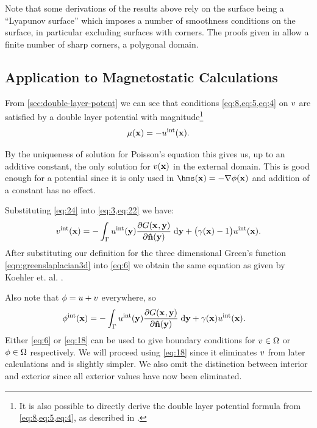 Note that some derivations of the results above rely on the surface being a ``Lyapunov surface'' which imposes a number of smoothness conditions on the surface, in particular excluding surfaces with corners.
The proofs given in \cite{Sternberg1946} allow a finite number of sharp corners, \ie a polygonal domain.

\subsection{Application to Magnetostatic Calculations}
\label{sec:appl-magn-calc}

From \cref{sec:double-layer-potent} we can see that conditions \cref{eq:8,eq:5,eq:4} on $v$ are satisfied by a double layer potential with magnitude\footnote{It is also possible to directly derive the double layer potential formula from \cref{eq:8,eq:5,eq:4}, as described in \cite[Appendix 2]{Knittel2011}.}
\begin{equation}
  \label{eq:24}
  \mu(\boldsymbol{\mathrm{x}}) = - u^{\mathrm{int}}(\boldsymbol{\mathrm{x}}).
\end{equation}

By the uniqueness of solution for Poisson's equation this gives us, up to an additive constant, the only solution for $v(\boldsymbol{\mathrm{x}})$ in the external domain.
This is good enough for a potential since it is only used in $\hms(\xv) = - \grad \phim(\xv)$ and addition of a constant has no effect.

Substituting \cref{eq:24} into \cref{eq:3,eq:22} we have:
\begin{equation}
  \label{eq:6}
  v^{\mathrm{int}}(\boldsymbol{\mathrm{x}}) =
  - \int_{{\Gamma}} u^{\mathrm{int}}(\boldsymbol{\mathrm{y}}) \frac{\partial G(\boldsymbol{\mathrm{x}}_{},\boldsymbol{\mathrm{y}})}{\partial \boldsymbol{\mathrm{\hat{n}}}(\boldsymbol{\mathrm{y}})} {\; \mathrm{{d}}} \boldsymbol{\mathrm{y}}
  + \big(\gamma(\boldsymbol{\mathrm{x}}) - 1 \big) u^{\mathrm{int}}(\boldsymbol{\mathrm{x}}).
\end{equation}
After substituting our definition for the three dimensional Green's function \cref{eqn:greenslaplacian3d} into \cref{eq:6} we obtain the same equation as given by Koehler et. al. \cite{Koehler1997}.

Also note that $\phi = u + v$ everywhere, so
\begin{equation}
  \begin{aligned}
    \label{eq:18}
    \phi^{\mathrm{int}}(\boldsymbol{\mathrm{x}})
    &= - \int_{{\Gamma}} u^{\mathrm{int}}(\boldsymbol{\mathrm{y}}) \frac{\partial G(\boldsymbol{\mathrm{x}}_{},\boldsymbol{\mathrm{y}})}{\partial \boldsymbol{\mathrm{\hat{n}}}(\boldsymbol{\mathrm{y}})} {\; \mathrm{{d}}} \boldsymbol{\mathrm{y}}
    + \gamma(\boldsymbol{\mathrm{x}}) u^{\mathrm{int}}(\boldsymbol{\mathrm{x}}).
  \end{aligned}
\end{equation}
Either \cref{eq:6} or \cref{eq:18} can be used to give boundary conditions for $v \in \Omega$ or $\phi \in \Omega$ respectively.
We will proceed using \cref{eq:18} since it eliminates $v$ from later calculations and is slightly simpler.
We also omit the distinction between interior and exterior since all exterior values have now been eliminated.

